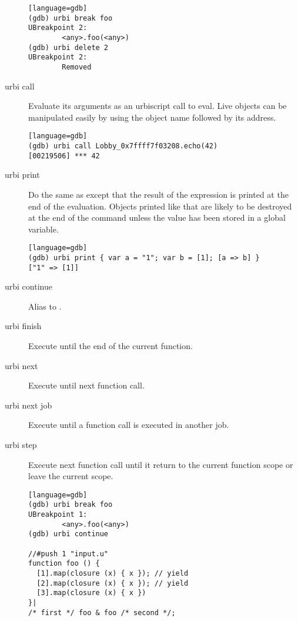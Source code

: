 \begin{description}
\begin{verbatim}[language=gdb]
(gdb) urbi break foo
UBreakpoint 2:
        <any>.foo(<any>)
(gdb) urbi delete 2
UBreakpoint 2:
        Removed
\end{verbatim}

\item[urbi call] Evaluate its arguments as an urbiscript call to eval.
  Live objects can be manipulated easily by using the object name followed
  by its address.

\begin{verbatim}[language=gdb]
(gdb) urbi call Lobby_0x7ffff7f03208.echo(42)
[00219506] *** 42
\end{verbatim}

\item[urbi print] Do the same as  except that the result
  of the expression is printed at the end of the evaluation.  Objects
  printed like that are likely to be destroyed at the end of the command
  unless the value has been stored in a global variable.

\begin{verbatim}[language=gdb]
(gdb) urbi print { var a = "1"; var b = [1]; [a => b] }
["1" => [1]]
\end{verbatim}

\item[urbi continue] Alias to .
\item[urbi finish] Execute until the end of the current function.
\item[urbi next] Execute until next \urbi function call.
\item[urbi next job] Execute until a function call is executed in another job.
\item[urbi step] Execute next \urbi function call until it return to the
  current function scope or leave the current scope.

\begin{verbatim}[language=gdb]
(gdb) urbi break foo
UBreakpoint 1:
        <any>.foo(<any>)
(gdb) urbi continue

//#push 1 "input.u"
function foo () {
  [1].map(closure (x) { x }); // yield
  [2].map(closure (x) { x }); // yield
  [3].map(closure (x) { x })
}|
/* first */ foo & foo /* second */;


\end{verbatim}
\end{description}
